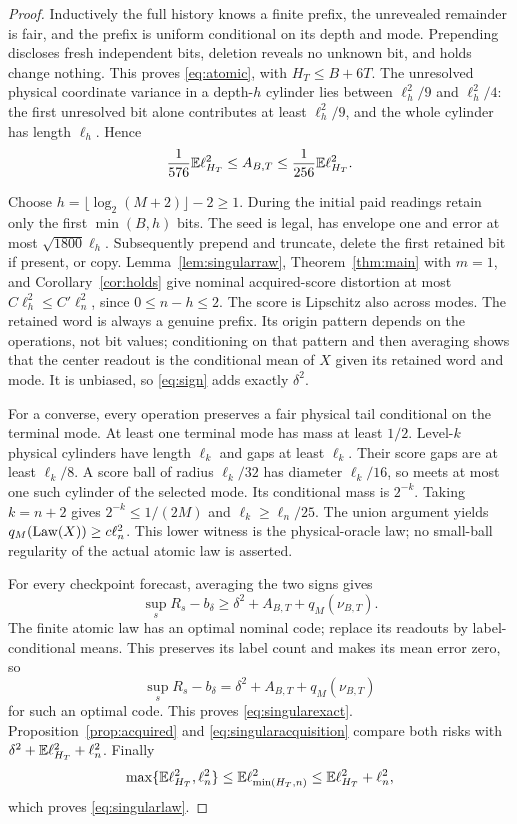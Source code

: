 \begin{proof}
Inductively the full history knows a finite prefix, the unrevealed remainder is fair, and the prefix is uniform conditional on its depth and mode. Prepending discloses fresh independent bits, deletion reveals no unknown bit, and holds change nothing. This proves \eqref{eq:atomic}, with $H_T\le B+6T$. The unresolved physical coordinate variance in a depth-$h$ cylinder lies between $\ell_h^2/9$ and $\ell_h^2/4$: the first unresolved bit alone contributes at least $\ell_h^2/9$, and the whole cylinder has length $\ell_h$. Hence
\begin{equation}\label{eq:singularacquisition}
 \frac1{576}\mathbb E\ell_{H_T}^2\le A_{B,T}\le\frac1{256}\mathbb E\ell_{H_T}^2.
\end{equation}

Choose $h=\lfloor\log_2(M+2)\rfloor-2\ge1$. During the initial paid readings retain only the first $\min(B,h)$ bits. The seed is legal, has envelope one and error at most $\sqrt{1800}\ell_h$. Subsequently prepend and truncate, delete the first retained bit if present, or copy. Lemma~\ref{lem:singularraw}, Theorem~\ref{thm:main} with $m=1$, and Corollary~\ref{cor:holds} give nominal acquired-score distortion at most $C\ell_h^2\le C'\ell_n^2$, since $0\le n-h\le2$. The score is Lipschitz also across modes. The retained word is always a genuine prefix. Its origin pattern depends on the operations, not bit values; conditioning on that pattern and then averaging shows that the center readout is the conditional mean of $X$ given its retained word and mode. It is unbiased, so \eqref{eq:sign} adds exactly $\delta^2$.

For a converse, every operation preserves a fair physical tail conditional on the terminal mode. At least one terminal mode has mass at least $1/2$. Level-$k$ physical cylinders have length $\ell_k$ and gaps at least $\ell_k$. Their score gaps are at least $\ell_k/8$. A score ball of radius $\ell_k/32$ has diameter $\ell_k/16$, so meets at most one such cylinder of the selected mode. Its conditional mass is $2^{-k}$. Taking $k=n+2$ gives $2^{-k}\le1/(2M)$ and $\ell_k\ge\ell_n/25$. The union argument yields $q_M(\operatorname{Law}(X))\ge c\ell_n^2$. This lower witness is the physical-oracle law; no small-ball regularity of the actual atomic law is asserted.

For every checkpoint forecast, averaging the two signs gives
\[
 \sup_s R_s-b_\delta\ge\delta^2+A_{B,T}+q_M(\nu_{B,T}).
\]
The finite atomic law has an optimal nominal code; replace its readouts by label-conditional means. This preserves its label count and makes its mean error zero, so
\[
 \sup_s R_s-b_\delta=\delta^2+A_{B,T}+q_M(\nu_{B,T})
\]
for such an optimal code. This proves \eqref{eq:singularexact}. Proposition~\ref{prop:acquired} and \eqref{eq:singularacquisition} compare both risks with $\delta^2+\mathbb E\ell_{H_T}^2+\ell_n^2$. Finally
\[
 \max\{\mathbb E\ell_{H_T}^2,\ell_n^2\}
 \le\mathbb E\ell_{\min(H_T,n)}^2
 \le\mathbb E\ell_{H_T}^2+\ell_n^2,
\]
which proves \eqref{eq:singularlaw}.
\end{proof}

